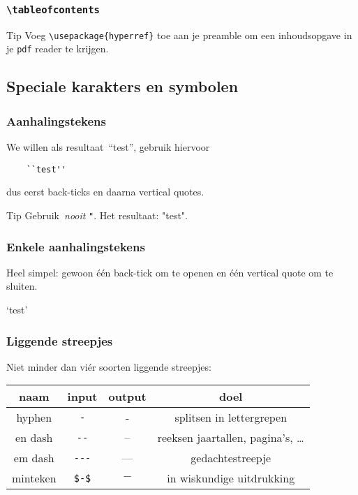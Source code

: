 \begin{frame}[fragile]
  \frametitle{\texttt{\textbackslash tableofcontents}}

  \begin{exampleblock}{Tip}
    Voeg \texttt{\textcolor{uagreen}{\textbackslash usepackage}\{hyperref\}} toe aan je preamble om een inhoudsopgave in je \texttt{pdf} reader te krijgen.
  \end{exampleblock}
\end{frame}

\subsection{Speciale karakters en symbolen}
\begin{frame}[fragile]
  \frametitle{Aanhalingstekens}

  We willen als resultaat~``test'', gebruik hiervoor
  \begin{verbatim}
	``test''
  \end{verbatim}
  dus eerst back-ticks en daarna vertical quotes.
  \begin{alertblock}{Tip}
	Gebruik~\emph{nooit} \verb|"|. Het resultaat: "test".
  \end{alertblock}
\end{frame}

\begin{frame}[fragile]
  \frametitle{Enkele aanhalingstekens}

  Heel simpel: gewoon \'e\'en back-tick om te openen en \'e\'en vertical quote om te sluiten.

  \begin{LTXexample}[numbers=none,basicstyle=\ttfamily]
`test'
  \end{LTXexample}
\end{frame}

\begin{frame}[fragile]
  \frametitle{Liggende streepjes}
  Niet minder dan vi\'er soorten liggende streepjes:
  \begin{tabular}[]{cccc}
	naam & input & output & doel \\\midrule
	hyphen & \verb|-| & - & splitsen in lettergrepen \\
	en dash & \verb|--| & -- & reeksen jaartallen, pagina's, \ldots \\
	em dash & \verb|---| & --- & gedachtestreepje \\
	minteken & \verb|$-$| & $-$ & in wiskundige uitdrukking
  \end{tabular}
\end{frame}

